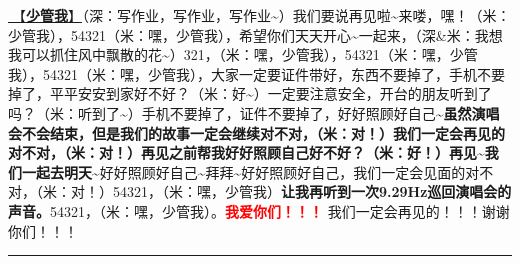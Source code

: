 \documentclass[]{ctexbook}
\begin{document}
\hyperref[watch-ur-manners]{🎵【\textbf{少管我}】}（深：写作业，写作业，写作业\textasciitilde）我们要说再见啦\textasciitilde 来喽，嘿！（米：少管我），54321（米：嘿，少管我），希望你们天天开心\textasciitilde 一起来，（深\&米：我想我可以抓住风中飘散的花\textasciitilde）321，（米：嘿，少管我），54321（米：嘿，少管我），54321（米：嘿，少管我），大家一定要证件带好，东西不要掉了，手机不要掉了，平平安安到家好不好？（米：好\textasciitilde）一定要注意安全，开台的朋友听到了吗？（米：听到了\textasciitilde）手机不要掉了，证件不要掉了，好好照顾好自己\textasciitilde{}\textbf{虽然演唱会不会结束，但是我们的故事一定会继续对不对，（米：对！）我们一定会再见的对不对，（米：对！）再见之前帮我好好照顾自己好不好？（米：好！）再见\textasciitilde 我们一起去明天\textasciitilde{}}好好照顾好自己\textasciitilde 拜拜\textasciitilde 好好照顾好自己，我们一定会见面的对不对，（米：对！）54321，（米：嘿，少管我）\textbf{让我再听到一次9.29Hz巡回演唱会的声音。}54321，（米：嘿，少管我）。\textbf{\textcolor{red}{我爱你们！！！} }我们一定会再见的！！！谢谢你们！！！

\begin{center}\rule{0.5\linewidth}{0.5pt}\end{center}
\end{document}
